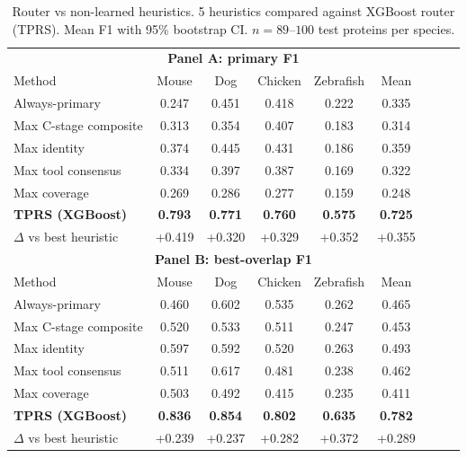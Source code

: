 \begin{table}[t]
\centering
\caption{Router vs non-learned heuristics. 5 heuristics compared against XGBoost router (TPRS). Mean F1 with 95\% bootstrap CI. $n = 89$--$100$ test proteins per species.}
\label{tab:s4_heuristic_baselines}
\scriptsize
\setlength{\tabcolsep}{2.5pt}
\begin{tabular}{lcccccccc}
\toprule
\multicolumn{9}{c}{\textbf{Panel A: primary F1}} \\
Method & Mouse & Dog & Chicken & Zebrafish & Mean \\
\midrule
Always-primary & 0.247 & 0.451 & 0.418 & 0.222 & 0.335 \\
Max C-stage composite & 0.313 & 0.354 & 0.407 & 0.183 & 0.314 \\
Max identity & 0.374 & 0.445 & 0.431 & 0.186 & 0.359 \\
Max tool consensus & 0.334 & 0.397 & 0.387 & 0.169 & 0.322 \\
Max coverage & 0.269 & 0.286 & 0.277 & 0.159 & 0.248 \\
\midrule
\textbf{TPRS (XGBoost)} & \textbf{0.793} & \textbf{0.771} & \textbf{0.760} & \textbf{0.575} & \textbf{0.725} \\
$\Delta$ vs best heuristic & +0.419 & +0.320 & +0.329 & +0.352 & +0.355 \\
\midrule
\multicolumn{9}{c}{\textbf{Panel B: best-overlap F1}} \\
Method & Mouse & Dog & Chicken & Zebrafish & Mean \\
\midrule
Always-primary & 0.460 & 0.602 & 0.535 & 0.262 & 0.465 \\
Max C-stage composite & 0.520 & 0.533 & 0.511 & 0.247 & 0.453 \\
Max identity & 0.597 & 0.592 & 0.520 & 0.263 & 0.493 \\
Max tool consensus & 0.511 & 0.617 & 0.481 & 0.238 & 0.462 \\
Max coverage & 0.503 & 0.492 & 0.415 & 0.235 & 0.411 \\
\midrule
\textbf{TPRS (XGBoost)} & \textbf{0.836} & \textbf{0.854} & \textbf{0.802} & \textbf{0.635} & \textbf{0.782} \\
$\Delta$ vs best heuristic & +0.239 & +0.237 & +0.282 & +0.372 & +0.289 \\
\bottomrule
\end{tabular}
\end{table}
